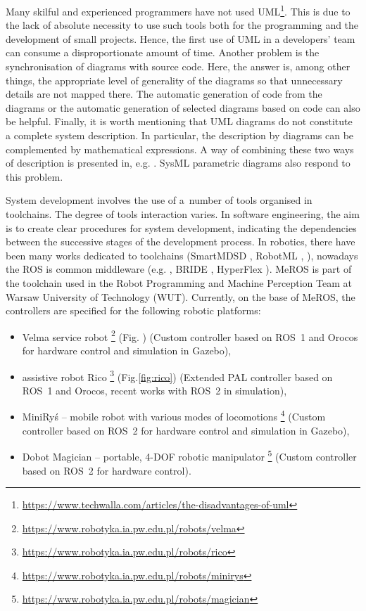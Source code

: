 \documentclass{ieeeaccess}
\begin{document}
	Many skilful and experienced programmers have not used UML\footnote{\url{https://www.techwalla.com/articles/the-disadvantages-of-uml}}. This is due to the lack of absolute necessity to use such tools both for the programming and the development of small projects. Hence, the first use of UML in a developers' team can consume a disproportionate amount of time. Another problem is the synchronisation of diagrams with source code. Here, the answer is, among other things, the appropriate level of generality of the diagrams so that unnecessary details are not mapped there. The automatic generation of code from the diagrams or the automatic generation of selected diagrams based on code can also be helpful. Finally, it is worth mentioning that UML diagrams do not constitute a complete system description. In particular, the description by diagrams can be complemented by mathematical expressions. A way of combining these two ways of description is presented in, e.g. \cite{earl2020}. SysML parametric diagrams also respond to this problem.
			
	System development involves the use of a~number of tools organised in toolchains. The degree of tools interaction varies. In software engineering, the aim is to create clear procedures for system development, indicating the dependencies between the successive stages of the development process. In robotics, there have been many works dedicated to toolchains (SmartMDSD \cite{dennis2016smartmdsd}, RobotML \cite{robotml2}, \cite{dal2022formal}), nowadays the ROS is common middleware (e.g. \cite{wienke2012meta}, BRIDE \cite{bubeck2014bride}, HyperFlex \cite{brugali2016hyperflex}). MeROS is part of the toolchain used in the Robot Programming and Machine Perception Team at Warsaw University of Technology (WUT). Currently, on the base of MeROS, the controllers are specified for the following robotic platforms:
	 \begin{itemize}
	 	\item Velma service robot  \cite{en14206693-grav-comp,Figat:2022:RAS} \footnote{\url{https://www.robotyka.ia.pw.edu.pl/robots/velma}} (Fig. ) (Custom controller based on ROS~1 and Orocos for hardware control and simulation in Gazebo),
	 	\item assistive robot Rico \cite{tasker2020,karwowski2021hubero} \footnote{\url{https://www.robotyka.ia.pw.edu.pl/robots/rico}} (Fig.\ref{fig:rico}) (Extended PAL controller based on ROS~1 and Orocos, recent works with ROS~2 in simulation),
	 	\item MiniRyś -- mobile robot with various modes of locomotions \footnote{\url{https://www.robotyka.ia.pw.edu.pl/robots/minirys}} (Custom controller based on ROS~2 for hardware control and simulation in Gazebo),
	 	\item Dobot Magician -- portable, 4-DOF robotic manipulator \footnote{\url{https://www.robotyka.ia.pw.edu.pl/robots/magician}} (Custom controller based on ROS~2 for hardware control).
	 \end{itemize}
	 
\end{document}

